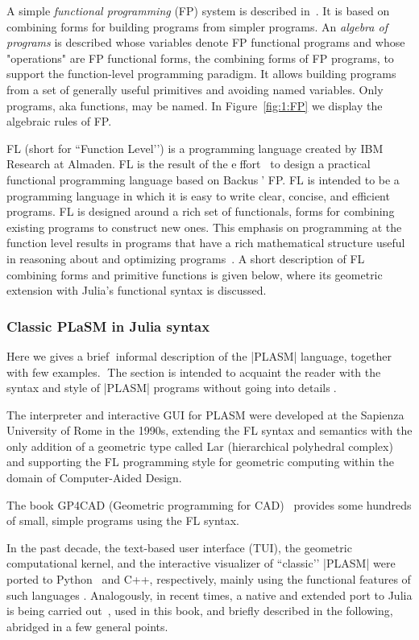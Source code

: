 A simple \emph{functional programming} (FP) system is described in~\cite{10.1145/359576.359579}. It is based on combining forms for building programs from simpler programs. An \emph{algebra of programs} is described whose variables denote FP functional programs and whose "operations" are FP functional forms, the combining forms of FP programs, to support the function-level programming paradigm. It allows building programs from a set of generally useful primitives and avoiding named variables. Only programs, aka functions, may be named. In Figure~\ref{fig:1:FP} we display the algebraic rules of FP.

FL (short for ``Function Level’’) is a programming language created by IBM Research at Almaden.
FL is the result of the effort~\cite{BWW90} to design a practical functional programming language based on Backus’ FP.  
FL is intended to be a programming language in which it is easy to write clear, concise,
and efficient programs. FL is designed around a rich set of functionals, forms for combining
existing programs to construct new ones. This emphasis on programming at the function
level results in programs that have a rich mathematical structure useful in reasoning about
and optimizing programs~\cite{IBM:RJ7100}.
A short description of FL combining forms  and primitive functions is given below, where its geometric extension with Julia’s functional syntax is discussed.

\subsubsection*{Classic PLaSM in Julia syntax}

Here we gives a brief informal description of the |PLASM| language, together with few examples. The section is intended to acquaint the reader with the syntax and style of |PLASM| programs without going into details. 

The interpreter and interactive GUI for PLASM were developed at the Sapienza University of Rome in the 1990s, extending the FL syntax and semantics with the only addition of a geometric type called Lar (hierarchical polyhedral complex) and supporting the FL programming style for geometric computing within the domain of Computer-Aided Design.

The book GP4CAD (Geometric programming for CAD)~\cite{Paoluzzi2003a} provides some hundreds of small, simple programs using the FL syntax.

In the past decade, the text-based user interface (TUI), the geometric computational kernel, and the interactive visualizer of ``classic’’ |PLASM| were ported to Python~\cite{pyplasm:2018} and C++, respectively, mainly using the functional features of such languages \cite{dia-report:2009}. Analogously, in recent times, a native and extended port to Julia is being carried out~\cite{plasm:2023}, used in this book, and briefly described in the following, abridged in a few general points.

